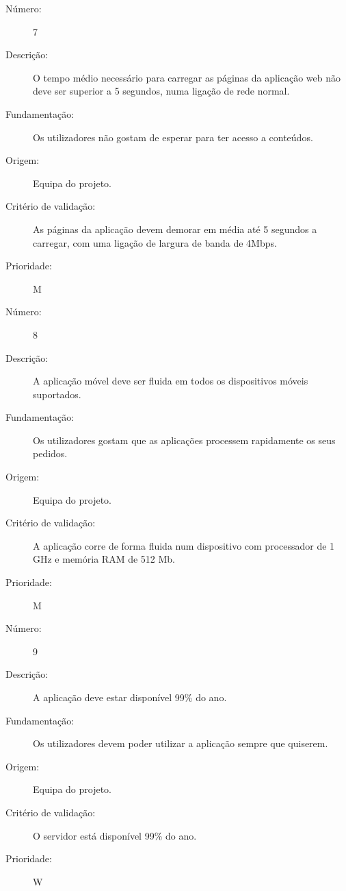\documentclass[12pt,a4paper]{article}
\begin{document}
      \begin{description}
        \item[Número:]7
        \item[Descrição:]O tempo médio necessário para carregar as páginas da aplicação web não deve ser superior a 5 segundos, numa ligação de rede normal.
        \item[Fundamentação:]Os utilizadores não gostam de esperar para ter acesso a conteúdos.
        \item[Origem:]Equipa do projeto.
        \item[Critério de validação:]As páginas da aplicação devem demorar em média até 5 segundos a carregar, com uma ligação de largura de banda de 4Mbps.
        \item[Prioridade:]M
      \end{description}
      \vspace{0.5cm}
            \begin{description}
        \item[Número:]8
        \item[Descrição:]A aplicação móvel deve ser fluida em todos os dispositivos móveis suportados.
        \item[Fundamentação:]Os utilizadores gostam que as aplicações processem rapidamente os seus pedidos.
        \item[Origem:]Equipa do projeto.
        \item[Critério de validação:]A aplicação corre de forma fluida num dispositivo com processador de 1 GHz e memória RAM de 512 Mb.
        \item[Prioridade:]M
      \end{description}
      \vspace{0.5cm}
            \begin{description}
        \item[Número:]9
        \item[Descrição:]A aplicação deve estar disponível 99\% do ano.
        \item[Fundamentação:]Os utilizadores devem poder utilizar a aplicação sempre que quiserem.
        \item[Origem:]Equipa do projeto.
        \item[Critério de validação:]O servidor está disponível 99\% do ano.
        \item[Prioridade:]W
      \end{description}
      \vspace{0.5cm}
\end{document}
